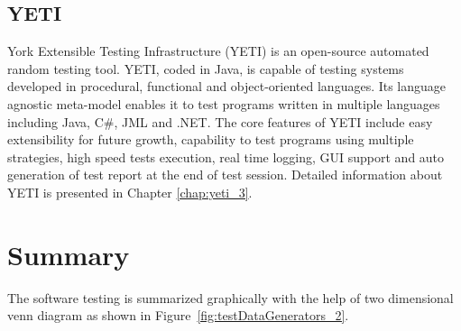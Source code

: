 
\subsection{YETI}
York Extensible Testing Infrastructure (YETI) is an open-source automated random testing tool. YETI, coded in Java, is capable of testing systems developed in procedural, functional and object-oriented languages. Its language agnostic meta-model enables it to test programs written in multiple languages including Java, C\#, JML and .NET. The core features of YETI include easy extensibility for future growth, capability to test programs using multiple strategies, high speed tests execution, real time logging, GUI support and auto generation of test report at the end of test session. Detailed information about YETI is presented in Chapter \ref{chap:yeti_3}.









\section{Summary}
The software testing is summarized graphically with the help of two dimensional venn diagram as shown in Figure~\ref{fig:testDataGenerators_2}. 


